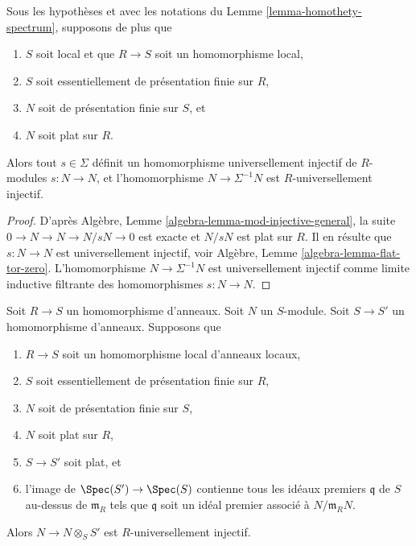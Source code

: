 \begin{lemma}
\label{lemma-homothety-universally-injective}
Sous les hypothèses et avec les notations du
Lemme \ref{lemma-homothety-spectrum},
supposons de plus que
\begin{enumerate}
\item $S$ soit local et que $R \to S$ soit un homomorphisme local,
\item $S$ soit essentiellement de présentation finie sur $R$,
\item $N$ soit de présentation finie sur $S$, et
\item $N$ soit plat sur $R$.
\end{enumerate}
Alors tout $s \in \Sigma$ définit un
homomorphisme universellement injectif de $R$-modules $s : N \to N$, et
l'homomorphisme $N \to \Sigma^{-1}N$ est $R$-universellement injectif.
\end{lemma}

\begin{proof}
D'après
Algèbre, Lemme \ref{algebra-lemma-mod-injective-general},
la suite $0 \to N \to N \to N/sN \to 0$ est exacte et
$N/sN$ est plat sur $R$. Il en résulte que $s : N \to N$
est universellement injectif, voir
Algèbre, Lemme \ref{algebra-lemma-flat-tor-zero}.
L'homomorphisme $N \to \Sigma^{-1}N$ est universellement injectif comme limite
inductive filtrante des homomorphismes $s : N \to N$.
\end{proof}

\begin{lemma}
\label{lemma-base-change-universally-flat-local}
Soit $R \to S$ un homomorphisme d'anneaux.
Soit $N$ un $S$-module.
Soit $S \to S'$ un homomorphisme d'anneaux.
Supposons que
\begin{enumerate}
\item $R \to S$ soit un homomorphisme local d'anneaux locaux,
\item $S$ soit essentiellement de présentation finie sur $R$,
\item $N$ soit de présentation finie sur $S$,
\item $N$ soit plat sur $R$,
\item $S \to S'$ soit plat, et
\item l'image de $\Spec(S') \to \Spec(S)$ contienne
tous les idéaux premiers $\mathfrak q$ de $S$ au-dessus de $\mathfrak m_R$
tels que $\mathfrak q$ soit un idéal premier associé à $N/\mathfrak m_R N$.
\end{enumerate}
Alors $N \to N \otimes_S S'$ est $R$-universellement injectif.
\end{lemma}


